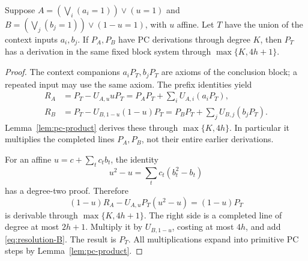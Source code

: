\begin{lemma}\label{lem:clause-resolution}
Suppose \(A=(\bigvee_i(a_i=1))\vee(u=1)\) and
\(B=(\bigvee_j(b_j=1))\vee(1-u=1)\), with \(u\) affine.
Let \(T\) have the union of the context inputs \(a_i,b_j\).
If \(P_A,P_B\) have PC derivations through degree \(K\), then \(P_T\)
has a derivation in the same fixed block system through
\(\max\{K,4h+1\}\).
\end{lemma}
\begin{proof}
The context companions \(a_iP_T,b_jP_T\) are axioms of the conclusion
block; a repeated input may use the same axiom.
The prefix identities yield
\begin{align}
 R_A&=P_T-U_{A,u}uP_T
       =P_AP_T+\sum_iU_{A,i}(a_iP_T),\label{eq:resolution-A}\\
 R_B&=P_T-U_{B,1-u}(1-u)P_T
       =P_BP_T+\sum_jU_{B,j}(b_jP_T).\label{eq:resolution-B}
\end{align}
Lemma~\ref{lem:pc-product} derives these through \(\max\{K,4h\}\).
In particular it multiplies the completed lines \(P_A,P_B\), not their
entire earlier derivations.

For an affine \(u=c+\sum_t c_tb_t\), the identity
\[
 u^2-u=\sum_t c_t(b_t^2-b_t)
\]
has a degree-two proof. Therefore
\begin{equation}\label{eq:pivot-correction}
 (1-u)R_A-U_{A,u}P_T(u^2-u)=(1-u)P_T
\end{equation}
is derivable through \(\max\{K,4h+1\}\).
The right side is a completed line of degree at most \(2h+1\).
Multiply it by \(U_{B,1-u}\), costing at most \(4h\), and add
\eqref{eq:resolution-B}. The result is \(P_T\).
All multiplications expand into primitive PC steps by
Lemma~\ref{lem:pc-product}.
\end{proof}

